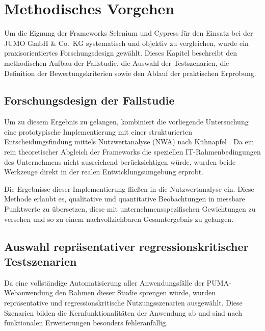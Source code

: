 \section{Methodisches Vorgehen}
\label{sec:methodik}

Um die Eignung der Frameworks Selenium und Cypress für den Einsatz bei der JUMO GmbH \& Co.\ KG systematisch und objektiv zu vergleichen, wurde ein praxisorientiertes Forschungsdesign gewählt. Dieses Kapitel beschreibt den methodischen Aufbau der Fallstudie, die Auswahl der Testszenarien, die Definition der Bewertungskriterien sowie den Ablauf der praktischen Erprobung.

\subsection{Forschungsdesign der Fallstudie}
Um zu diesem Ergebnis zu gelangen, kombiniert die vorliegende Untersuchung eine prototypische Implementierung mit einer strukturierten Entscheidungsfindung mittels Nutzwertanalyse (NWA) nach Kühnapfel \cite{Kuehnapfel2021}. Da ein rein theoretischer Abgleich der Frameworks die speziellen IT-Rahmenbedingungen des Unternehmens nicht ausreichend berücksichtigen würde, wurden beide Werkzeuge direkt in der realen Entwicklungsumgebung erprobt. 

Die Ergebnisse dieser Implementierung fließen in die Nutzwertanalyse ein. Diese Methode erlaubt es, qualitative und quantitative Beobachtungen in messbare Punktwerte zu übersetzen, diese mit unternehmensspezifischen Gewichtungen zu versehen und so zu einem nachvollziehbaren Gesamtergebnis zu gelangen.

\subsection{Auswahl repräsentativer regressionskritischer Testszenarien}
Da eine vollständige Automatisierung aller Anwendungsfälle der \glqq PUMA\grqq-Webanwendung den Rahmen dieser Studie sprengen würde, wurden repräsentative und regressionskritische Nutzungsszenarien ausgewählt. Diese Szenarien bilden die Kernfunktionalitäten der Anwendung ab und sind nach funktionalen Erweiterungen besonders fehleranfällig. 

